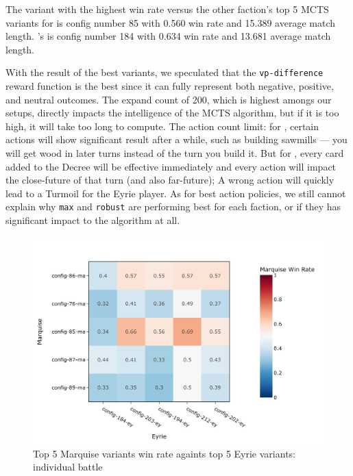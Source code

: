 The variant with the highest win rate versus the other faction's top 5 MCTS variants for \Marquise{} is config number 85 with 0.560 win rate and 15.389 average match length. \Eyrie{}'s is config number 184 with 0.634 win rate and 13.681 average match length.

With the result of the best variants, we speculated that the \texttt{vp-difference} reward function is the best since it can fully represent both negative, positive, and neutral outcomes. The expand count of 200, which is highest amongs our setups, directly impacts the intelligence of the MCTS algorithm, but if it is too high, it will take too long to compute. The action count limit: for \Marquise{}, certain actions will show significant result after a while, such as building sawmills — you will get wood in later turns instead of the turn you build it. But for \Eyrie{}, every card added to the Decree will be effective immediately and every action will impact the close-future of that turn (and also far-future); A wrong action will quickly lead to a Turmoil for the Eyrie player. As for best action policies, we still cannot explain why \texttt{max} and \texttt{robust} are performing best for each faction, or if they has significant impact to the algorithm at all.

\begin{figure}[h!]
    \begin{center}
      \includegraphics[width=\textwidth]{./images/fig-stage-2-marquise-win-rate.jpeg}
    \end{center}
    \caption{Top 5 Marquise variants win rate againts top 5 Eyrie variants: individual battle}
    \label{fig:top-5-ma-wr-against-top-5-ey}
\end{figure}

